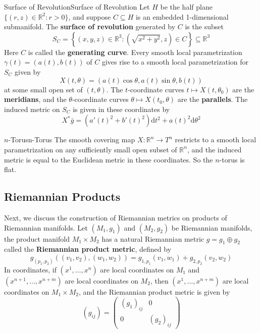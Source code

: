 \documentclass[../main.tex]{subfiles}
\begin{document}
\begin{example}{Surface of Revolution}{Surface of Revolution}
	Let $H$ be the half plane $\{(r, z) \in \mathbb{R}^2 : r > 0\}$, and suppose $C \subseteq H$ is an embedded 1-dimensional submanifold. The \textbf{surface of revolution} generated by $C$ is the subset
	\begin{equation}
		S_C = \left\{(x, y, z) \in \mathbb{R}^3 : \left(\sqrt{x^2 + y^2}, z\right) \in C\right\} \subseteq \mathbb{R}^3
	\end{equation}
	Here $C$ is called the \textbf{generating curve}. Every smooth local parametrization $\gamma(t) = (a(t), b(t))$ of $C$ gives rise to a smooth local parametrization for $S_C$ given by
	\begin{equation}
		X(t, \theta) = (a(t)\cos\theta, a(t)\sin\theta, b(t))
	\end{equation}
	at some small open set of $(t, \theta)$. The $t$-coordinate curves $t \mapsto X(t, \theta_0)$ are the \textbf{meridians}, and the $\theta$-coordinate curves $\theta \mapsto X(t_0, \theta)$ are the \textbf{parallels}. The induced metric on $S_C$ is given in these coordinates by
	\begin{equation*}
		X^*\bar{g} = (a'(t)^2 + b'(t)^2) \mathrm{d}t^2 + a(t)^2 \mathrm{d}\theta^2
	\end{equation*}
\end{example}

\begin{example}{$n$-Torus}{n-Torus}
	The smooth covering map $X: \mathbb{R}^n \to T^n$ restricts to a smooth local parametrization on any sufficiently small open subset of $\mathbb{R}^n$, and the induced metric is equal to the Euclidean metric in these coordinates. So the $n$-torus is flat.
\end{example}

\subsection{Riemannian Products}
Next, we discuss the construction of Riemannian metrics on products of Riemannian manifolds. Let $(M_1, g_1)$ and $(M_2, g_2)$ be Riemannian manifolds, the product manifold $M_1 \times M_2$ has a natural Riemannian metric $g = g_1 \oplus g_2$ called the \textbf{Riemannian product metric}, defined by
\begin{equation}
	g_{(p_1, p_2)}((v_1, v_2), (w_1, w_2)) = g_{1, p_1}(v_1, w_1) + g_{2, p_2}(v_2, w_2)
\end{equation}
In coordinates, if $(x^1, \ldots, x^{n})$ are local coordinates on $M_1$ and $(x^{n+1}, \ldots, x^{n+m})$ are local coordinates on $M_2$, then $(x^1, \ldots, x^{n+m})$ are local coordinates on $M_1 \times M_2$, and the Riemannian product metric is given by
\begin{equation}
	(g_{ij}) = \begin{pmatrix}
		(g_1)_{ij} & 0          \\
		0          & (g_2)_{ij}
	\end{pmatrix}
\end{equation}
\end{document}
